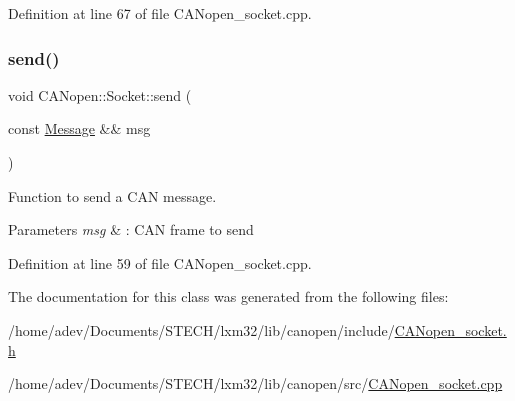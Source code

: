 Definition at line 67 of file C\+A\+Nopen\+\_\+socket.\+cpp.

\mbox{\label{class_c_a_nopen_1_1_socket_aa147801723e58f287d06b6df28837c44}} 
\subsubsection{\texorpdfstring{send()}{send()}}
{\footnotesize\ttfamily void C\+A\+Nopen\+::\+Socket\+::send (\begin{DoxyParamCaption}\item[{const \hyperlink{class_c_a_nopen_1_1_message}{Message} \&\&}]{msg }\end{DoxyParamCaption})}



Function to send a C\+AN message. 


\begin{DoxyParams}{Parameters}
{\em msg} & \+: C\+AN frame to send \\
\hline
\end{DoxyParams}


Definition at line 59 of file C\+A\+Nopen\+\_\+socket.\+cpp.



The documentation for this class was generated from the following files\+:\begin{DoxyCompactItemize}
\item 
/home/adev/\+Documents/\+S\+T\+E\+C\+H/lxm32/lib/canopen/include/\hyperlink{_c_a_nopen__socket_8h}{C\+A\+Nopen\+\_\+socket.\+h}\item 
/home/adev/\+Documents/\+S\+T\+E\+C\+H/lxm32/lib/canopen/src/\hyperlink{_c_a_nopen__socket_8cpp}{C\+A\+Nopen\+\_\+socket.\+cpp}\end{DoxyCompactItemize}
